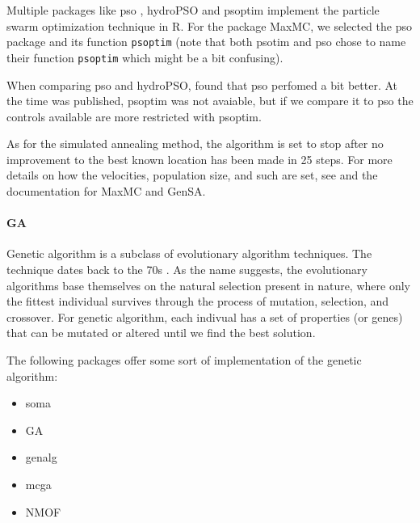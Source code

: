\documentclass[]{article}\usepackage[]{graphicx}\usepackage[]{color}
\newcommand{\pkg}[1]{{\normalfont\fontseries{b}\selectfont #1}}
\let\proglang=\textsf
\let\code=\texttt
\begin{document}
	Multiple packages like \pkg{pso} \citep{bendtsen_pso:_2012}, \pkg{hydroPSO} \citep{zambrano-bigiarini_hydropso:_2014} and \pkg{psoptim}	\citep{ciupke_psoptim:_2016} implement the particle swarm optimization technique in \proglang{R}. For the package \pkg{MaxMC}, we selected the \pkg{pso} package and its function \code{psoptim} (note that both \pkg{psotim} and \pkg{pso} chose to name their function \code{psoptim} which might be a bit confusing).

	When comparing \pkg{pso} and \pkg{hydroPSO}, \cite{mullen_continuous_2014} found that \pkg{pso} perfomed a bit better. At the time \cite{mullen_continuous_2014} was published, \pkg{psoptim} was not avaiable, but if we compare it to \pkg{pso} the controls available are more restricted with \pkg{psoptim}.

	As for the simulated annealing method, the algorithm is set to stop after no improvement to the best known location has been made in 25 steps. For more details on how the velocities, population size, and such are set, see \cite{bendtsen_pso:_2012} and the documentation for \pkg{MaxMC} and \pkg{GenSA}.


	\paragraph{GA}

	Genetic algorithm is a subclass of evolutionary algorithm techniques. The technique dates back to the 70s \citep{holland_adaptation_1992}. As the name suggests, the evolutionary algorithms base themselves on the natural selection present in nature, where only the fittest individual survives through the process of mutation, selection, and crossover. For genetic algorithm, each indivual has a set of properties (or genes) that can be mutated or altered until we find the best solution.

	The following packages offer some sort of implementation of the genetic algorithm:
	\begin{itemize}
		\item \pkg{soma} \citep{clayden_soma:_2014}
		\item \pkg{GA} \citep{scrucca_ga:_2013,scrucca_extensions_2016}
		\item \pkg{genalg} \citep{willighagen_genalg:_2015}
		\item \pkg{mcga} \citep{satman_machine_2013}
		\item \pkg{NMOF} \citep{gilli_numerical_2011}
	\end{itemize}
\end{document}
